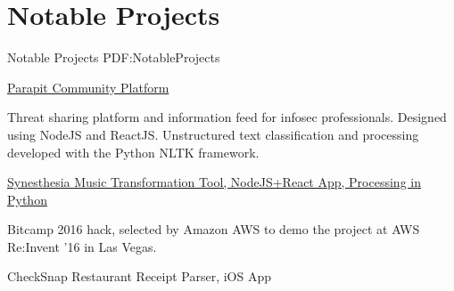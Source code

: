 
\section
{Notable Projects}
{Notable Projects}
{PDF:NotableProjects}

\BulletItem
\href{http://parapit.com}
{Parapit Community Platform}
\hfill
{}
\begin{detail}
\SubBulletItem
Threat sharing platform and information feed for infosec professionals. Designed using NodeJS and ReactJS.
\SubBulletItem
Unstructured text classification and processing developed with the Python NLTK framework. 
\end{detail}

\GapNoBreak
\BulletItem
\href{https://github.com/bekher/synesthesia-web}
{Synesthesia Music Transformation Tool, NodeJS+React App, Processing in Python}
\hfill
{}
\begin{detail}
\SubBulletItem
Bitcamp 2016 hack, selected by Amazon AWS to demo the project at AWS Re:Invent '16 in Las Vegas.
\end{detail}


\GapNoBreak
\BulletItem
CheckSnap Restaurant Receipt Parser, iOS App
\hfill
{}


